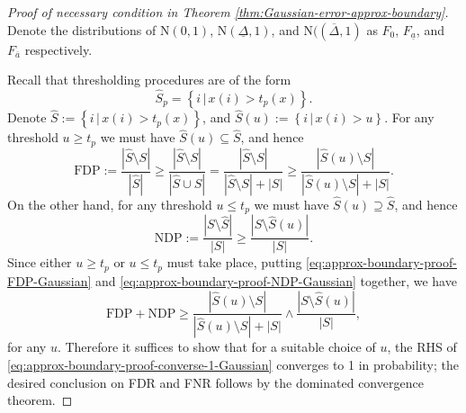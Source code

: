 \begin{proof}[Proof of necessary condition in Theorem \ref{thm:Gaussian-error-approx-boundary}]
Denote the distributions of $\mathrm{N}(0,1)$, $\mathrm{N}(\underline{\Delta}, 1)$, and $\mathrm{N}((\overline{\Delta}, 1)$ as $F_0$, $F_{\underline{a}}$, and $F_{\overline{a}}$ respectively.


Recall that thresholding procedures are of the form
$$
\widehat{S}_p = \left\{i\,|\,x(i) > t_p(x)\right\}.
$$
Denote $\widehat{S} := \left\{i\,|\,x(i) > t_p(x)\right\}$, and $\widehat{S}(u) := \left\{i\,|\,x(i) > u\right\}$.
For any threshold $u\ge t_p$ we must have $\widehat{S}(u)\subseteq\widehat{S}$, and hence
\begin{equation} \label{eq:approx-boundary-proof-FDP-Gaussian}
    \text{FDP} := \frac{|\widehat{S}\setminus{S}|}{|\widehat{S}|} \ge \frac{|\widehat{S}\setminus{S}|}{|\widehat{S}\cup{S}|} = \frac{|\widehat{S}\setminus{S}|}{|\widehat{S}\setminus{S}| + |S|} \ge
    \frac{|\widehat{S}(u)\setminus{S}|}{|\widehat{S}(u)\setminus{S}| + |S|}.
\end{equation}
On the other hand, for any threshold $u\le t_p$ we must have $\widehat{S}(u)\supseteq\widehat{S}$, and hence
\begin{equation} \label{eq:approx-boundary-proof-NDP-Gaussian}
    \text{NDP} := \frac{|{S}\setminus\widehat{S}|}{|{S}|} \ge 
    \frac{|{S}\setminus\widehat{S}(u)|}{|{S}|}.
\end{equation}
Since either $u\ge t_p$ or  $u\le t_p$ must take place, putting \eqref{eq:approx-boundary-proof-FDP-Gaussian} and \eqref{eq:approx-boundary-proof-NDP-Gaussian} together, we have
\begin{equation} \label{eq:approx-boundary-proof-converse-1-Gaussian}
    \text{FDP} + \text{NDP} 
    \ge \frac{|\widehat{S}(u)\setminus{S}|}{|\widehat{S}(u)\setminus{S}|+|{S}|} \wedge \frac{|{S}\setminus\widehat{S}(u)|}{|{S}|},
\end{equation}
for any $u$.
Therefore it suffices to show that for a suitable choice of $u$, the RHS of \eqref{eq:approx-boundary-proof-converse-1-Gaussian} converges to 1 in probability; the desired conclusion on FDR and FNR follows by the dominated convergence theorem.


\end{proof}

